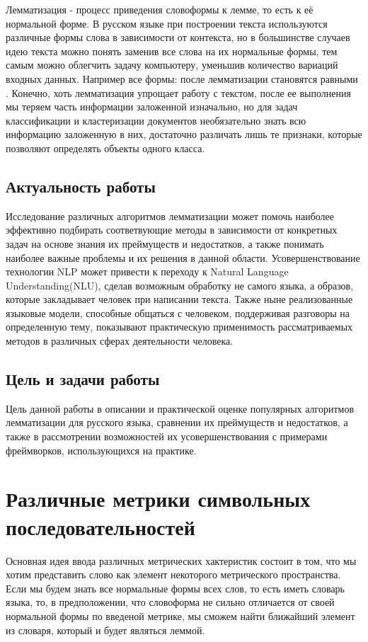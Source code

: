 \documentclass[12pt, a4paper]{article}
\begin{document}
Лемматизация - процесс приведения словоформы к лемме, то есть к её нормальной форме. В русском языке при построении текста используются различные формы слова в зависимости от контекста, но в большинстве случаев идею текста можно понять заменив все слова на их нормальные формы, тем самым можно облегчить задачу компьютеру, уменьшив количество вариаций входных данных. Например все формы:  после лемматизации становятся равными . Конечно, хоть лемматизация упрощает работу с текстом, после ее выполнения мы теряем часть информации заложенной изначально, но для задач классификации и кластеризации документов необязательно знать всю информацию заложенную в них, достаточно различать лишь те признаки, которые позволяют определять объекты одного класса.

\subsection{Актуальность работы}
\quad Исследование различных алгоритмов лемматизации может помочь наиболее эффективно подбирать соответвующие методы в зависимости от конкретных задач на основе знания их преймуществ и недостатков, а также понимать наиболее важные проблемы и их решения в данной области. Усовершенствование технологии NLP может привести к переходу к Natural Language Understanding(NLU), сделав возможным обработку не самого языка, а образов, которые закладывает человек при написании текста. Также ныне реализованные языковые модели, способные общаться с человеком, поддерживая разговоры на определенную тему, показывают практическую применимость рассматриваемых методов в различных сферах деятельности человека.

\subsection{Цель и задачи работы}
\quad Цель данной работы в описании и практической оценке популярных алгоритмов лемматизации для русского языка, сравнении их преймуществ и недостатков, а также в рассмотрении возможностей их усовершенствования с примерами фреймворков, использующихся на практике.

\section{Различные метрики символьных последовательностей}
\quad Основная идея ввода различных метрических хактеристик состоит в том, что мы хотим представить слово как элемент некоторого метрического пространства. Если мы будем знать все нормальные формы всех слов, то есть иметь словарь языка, то, в предположении, что словоформа не сильно отличается от своей нормальной формы по введеной метрике, мы сможем найти ближайший элемент из словаря, который и будет являться леммой.
\end{document}
